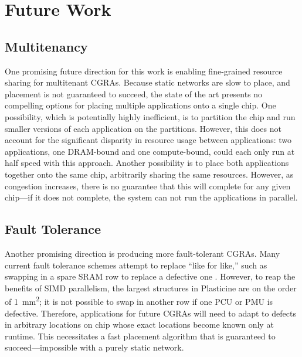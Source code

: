 \section{Future Work}
\label{sec:future}
\subsection{Multitenancy}
One promising future direction for this work is enabling fine-grained resource sharing for multitenant CGRAs.
Because static networks are slow to place, and placement is not guaranteed to succeed, the state of the art presents no compelling options for placing multiple applications onto a single chip.
One possibility, which is potentially highly inefficient, is to partition the chip and run smaller versions of each application on the partitions. 
However, this does not account for the significant disparity in resource usage between applications: two applications, one DRAM-bound and one compute-bound, could each only run at half speed with this approach.
Another possibility is to place both applications together onto the same chip, arbitrarily sharing the same resources. 
However, as congestion increases, there is no guarantee that this will complete for any given chip---if it does not complete, the system can not run the applications in parallel.

\subsection{Fault Tolerance}
Another promising direction is producing more fault-tolerant CGRAs.
Many current fault tolerance schemes attempt to replace ``like for like,'' such as swapping in a spare SRAM row to replace a defective one \cite{}.
However, to reap the benefits of SIMD parallelism, the largest structures in Plasticine are on the order of \SI{1}{mm^2}; it is not possible to swap in another row if one PCU or PMU is defective.
Therefore, applications for future CGRAs will need to adapt to defects in arbitrary locations on chip whose exact locations become known only at runtime.
This necessitates a fast placement algorithm that is guaranteed to succeed---impossible with a purely static network.
